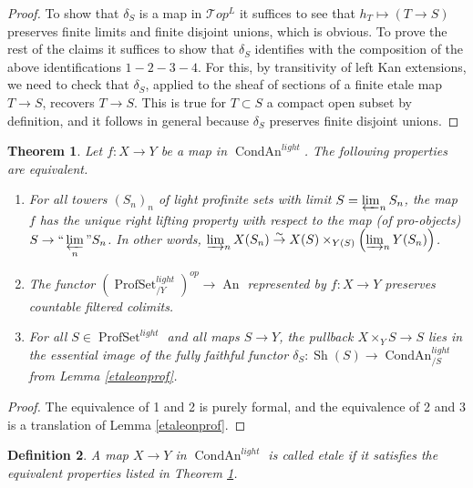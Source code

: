 \documentclass[12pt]{article}
\newtheorem{theorem}{Theorem}[section]
\newtheorem{definition}[theorem]{Definition}
\newcommand{\on}{\operatorname}
\begin{document}
\begin{proof}
To show that $\delta_S$ is a map in $\mathcal{T}op^L$ it suffices to see that $h_T\mapsto (T\rightarrow S)$ preserves finite limits and finite disjoint unions, which is obvious.  To prove the rest of the claims it suffices to show that $\delta_S$ identifies with the composition of the above identifications $1-2-3-4$.  For this, by transitivity of left Kan extensions, we need to check that $\delta_S$, applied to the sheaf of sections of a finite etale map $T\rightarrow S$, recovers $T\rightarrow S$. This is true for $T\subset S$ a compact open subset by definition, and it follows in general because $\delta_S$ preserves finite disjoint unions.
\end{proof}


\begin{theorem}\label{etale}
Let $f:X\to Y $ be a map in $\on{CondAn}^{light}$.  The following properties are equivalent.
\begin{enumerate}
\item For all towers $(S_n)_n$ of light profinite sets with limit $S=\varprojlim_n S_n$, the map $f$ has the unique right lifting property with respect to the map (of pro-objects) $S\rightarrow \underset{n}{``\varprojlim"} S_n$. In other words, $\varinjlim_n X(S_n)\overset{\sim}{\rightarrow} X(S)\times_{Y(S)} \left(\varinjlim_n Y(S_n)\right)$.
\item The functor $(\on{ProfSet}^{light}_{/Y})^{op}\rightarrow \on{An}$ represented by $f:X\to Y$ preserves countable filtered colimits.
\item For all $S\in\on{ProfSet}^{light}$ and all maps $S\rightarrow Y$, the pullback $X\times_YS \rightarrow S$ lies in the essential image of the fully faithful functor $\delta_S:\on{Sh}(S)\rightarrow \on{CondAn}^{light}_{/S}$ from Lemma \ref{etaleonprof}.
\end{enumerate}
\end{theorem}
\begin{proof}
The equivalence of 1 and 2 is purely formal, and the equivalence of 2 and 3 is a translation of Lemma \ref{etaleonprof}.
\end{proof}

\begin{definition}
A map $X\rightarrow Y$ in $\on{CondAn}^{light}$ is called \emph{etale} if it satisfies the equivalent properties listed in Theorem \ref{etale}.
\end{definition}
\end{document}
